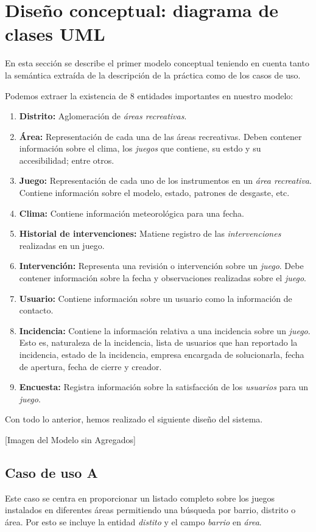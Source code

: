 \documentclass[]{article}
\begin{document}
\section{Diseño conceptual: diagrama de clases UML}
\label{sec:disenno}
En esta sección se describe el primer modelo conceptual teniendo en cuenta tanto la semántica extraída de la descripción de la práctica como de los casos de uso.

Podemos extraer la existencia de 8 entidades importantes en nuestro modelo:
\begin{enumerate}
    \item \textbf{Distrito:} Aglomeración de \textit{áreas recreativas}.
    \item \textbf{Área:} Representación de cada una de las áreas recreativas. Deben contener información sobre el clima, los \textit{juegos} que contiene, su estdo y su accesibilidad; entre otros.
    \item \textbf{Juego:} Representación de cada uno de los instrumentos en un \textit{área recreativa}. Contiene información sobre el modelo, estado, patrones de desgaste, etc.
    \item \textbf{Clima:} Contiene información meteorológica para una fecha.
    \item \textbf{Historial de intervenciones:} Matiene registro de las \textit{intervenciones} realizadas en un juego.
    \item \textbf{Intervención:} Representa una revisión o intervención sobre un \textit{juego}. Debe contener información sobre la fecha y observaciones realizadas sobre el \textit{juego}.
    \item \textbf{Usuario:} Contiene información sobre un usuario como la información de contacto.
    \item \textbf{Incidencia:} Contiene la información relativa a una incidencia sobre un \textit{juego}. Esto es, naturaleza de la incidencia, lista de usuarios que han reportado la incidencia, estado de la incidencia, empresa encargada de solucionarla, fecha de apertura, fecha de cierre y creador. 
    \item \textbf{Encuesta:} Registra información sobre la satisfacción de los \textit{usuarios} para un \textit{juego}.
\end{enumerate}
Con todo lo anterior, hemos realizado el siguiente diseño del sistema.

[Imagen del Modelo sin Agregados]

\subsection{Caso de uso A}
\label{subsec:casoA}
Este caso se centra en proporcionar un listado completo sobre los juegos instalados en diferentes áreas permitiendo una búsqueda por barrio, distrito o área. Por esto se incluye la entidad \textit{distito} y el campo \textit{barrio} en \textit{área}.
\end{document}
